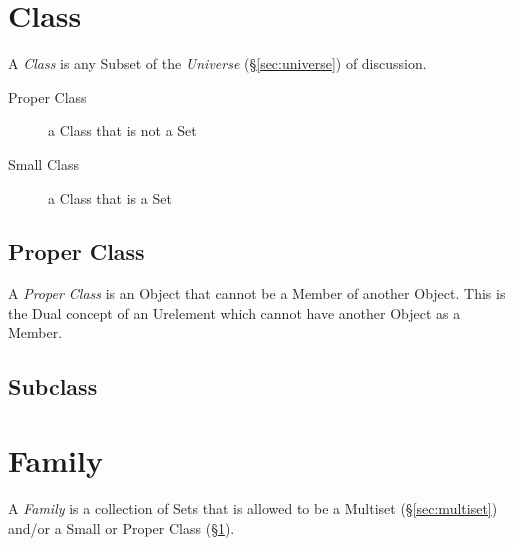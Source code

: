 \section{Class}\label{sec:class}

A \emph{Class} is any Subset of the \emph{Universe}
(\S\ref{sec:universe}) of discussion.

\begin{description}
  \item [Proper Class] a Class that is not a Set
  \item [Small Class] a Class that is a Set
\end{description}



\subsection{Proper Class}\label{sec:proper_class}

A \emph{Proper Class} is an Object that cannot be a Member of another
Object. This is the Dual concept of an Urelement which cannot have
another Object as a Member.



\subsection{Subclass}\label{sec:subclass}



\section{Family}\label{sec:family}

A \emph{Family} is a collection of Sets that is allowed to be a
Multiset (\S\ref{sec:multiset}) and/or a Small or Proper Class
(\S\ref{sec:class}).



